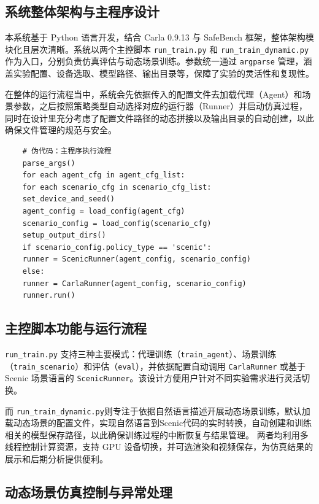 \subsection{系统整体架构与主程序设计}

本系统基于 Python 语言开发，结合 Carla 0.9.13 与 SafeBench 框架，整体架构模块化且层次清晰。系统以两个主控脚本 \texttt{run\_train.py} 和 \texttt{run\_train\_dynamic.py} 作为入口，分别负责仿真评估与动态场景训练。参数统一通过 \texttt{argparse} 管理，涵盖实验配置、设备选取、模型路径、输出目录等，保障了实验的灵活性和复现性。

在整体的运行流程当中，系统会先依据传入的配置文件去加载代理（Agent）和场景参数，之后按照策略类型自动选择对应的运行器（Runner）并启动仿真过程，同时在设计里充分考虑了配置文件路径的动态拼接以及输出目录的自动创建，以此确保文件管理的规范与安全。

\begin{verbatim}
	# 伪代码：主程序执行流程
	parse_args()
	for each agent_cfg in agent_cfg_list:
	for each scenario_cfg in scenario_cfg_list:
	set_device_and_seed()
	agent_config = load_config(agent_cfg)
	scenario_config = load_config(scenario_cfg)
	setup_output_dirs()
	if scenario_config.policy_type == 'scenic':
	runner = ScenicRunner(agent_config, scenario_config)
	else:
	runner = CarlaRunner(agent_config, scenario_config)
	runner.run()
\end{verbatim}

\subsection{主控脚本功能与运行流程}

\texttt{run\_train.py} 支持三种主要模式：代理训练（\texttt{train\_agent}）、场景训练（\texttt{train\_scenario}）和评估（\texttt{eval}），并依据配置自动调用 \texttt{CarlaRunner} 或基于 Scenic 场景语言的 \texttt{ScenicRunner}。该设计方便用户针对不同实验需求进行灵活切换。

而 \texttt{run\_train\_dynamic.py}则专注于依据自然语言描述开展动态场景训练，默认加载动态场景的配置文件，实现自然语言到Scenic代码的实时转换，自动创建和训练相关的模型保存路径，以此确保训练过程的中断恢复与结果管理。
两者均利用多线程控制计算资源，支持 GPU 设备切换，并可选渲染和视频保存，为仿真结果的展示和后期分析提供便利。

\subsection{动态场景仿真控制与异常处理}

